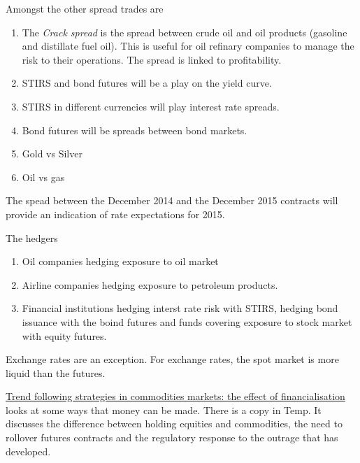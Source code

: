 \documentclass[12pt, a4paper, oneside]{article}\usepackage[]{graphicx}\usepackage[]{color}
\begin{document}
Amongst the other spread trades are 
\begin{enumerate}
\item The \emph{Crack spread} is the spread between crude oil and oil products (gasoline and distillate fuel oil).  This is useful for oil refinary companies to manage the risk to their operations. The spread is linked to profitability. 
\item STIRS and bond futures will be a play on the yield curve.
\item STIRS in different currencies will play interest rate spreads. 
\item Bond futures will be spreads between bond markets. 
\item Gold vs Silver 
\item Oil vs gas
\end{enumerate}

The spead between the December 2014 and the December 2015 contracts will provide an indication of rate expectations for 2015.

The hedgers 
\begin{enumerate}
\item Oil companies hedging exposure to oil market
\item Airline companies hedging exposure to petroleum products.
\item Financial institutions hedging interst rate risk with STIRS, hedging bond issuance with the boind futures and funds covering exposure to stock market with equity futures. 
\end{enumerate}



Exchange rates are an exception.  For exchange rates, the spot market is more liquid than the futures. 


\href{http://www.kellogg.northwestern.edu/faculty/neuhierl/jmp.pdf}{Trend following strategies in commodities markets:  the effect of financialisation} looks at some ways that money can be made.  There is a copy in Temp.  It discusses the difference between holding equities and commodities, the need to rollover futures contracts and the regulatory response to the outrage that has developed. 
\end{document}
